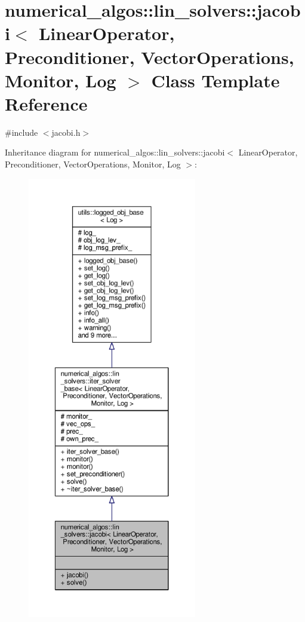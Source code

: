 \hypertarget{classnumerical__algos_1_1lin__solvers_1_1jacobi}{\section{numerical\-\_\-algos\-:\-:lin\-\_\-solvers\-:\-:jacobi$<$ Linear\-Operator, Preconditioner, Vector\-Operations, Monitor, Log $>$ Class Template Reference}
\label{classnumerical__algos_1_1lin__solvers_1_1jacobi}
}


{\ttfamily \#include $<$jacobi.\-h$>$}



Inheritance diagram for numerical\-\_\-algos\-:\-:lin\-\_\-solvers\-:\-:jacobi$<$ Linear\-Operator, Preconditioner, Vector\-Operations, Monitor, Log $>$\-:\nopagebreak
\begin{figure}[H]
\begin{center}
\leavevmode
\includegraphics[height=550pt]{classnumerical__algos_1_1lin__solvers_1_1jacobi__inherit__graph}
\end{center}
\end{figure}


